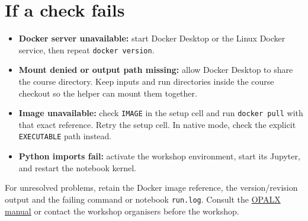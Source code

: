 \documentclass[11pt,a4paper]{article}
\begin{document}
\section{If a check fails}
\begin{itemize}
\item \textbf{Docker server unavailable:} start Docker Desktop or the Linux
Docker service, then repeat \texttt{docker version}.
\item \textbf{Mount denied or output path missing:} allow Docker Desktop to
share the course directory. Keep inputs and run directories inside the course
checkout so the helper can mount them together.
\item \textbf{Image unavailable:} check \texttt{IMAGE} in the setup cell and
run \texttt{docker pull} with that exact reference. Retry the setup cell. In
native mode, check the explicit \texttt{EXECUTABLE} path instead.
\item \textbf{Python imports fail:} activate the workshop environment, start
its Jupyter, and restart the notebook kernel.
\end{itemize}
For unresolved problems, retain the Docker image reference, the version/revision
output and the failing command or notebook \texttt{run.log}. Consult the
\href{https://opalx-project.github.io/opalx-manual/}{OPALX manual} or contact the
workshop organisers before the workshop.
\end{document}
